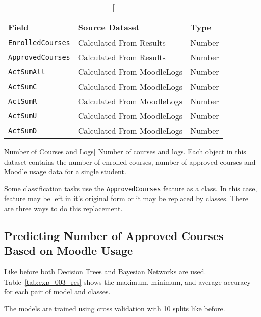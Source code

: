 \begin{table}[h!]
    \centering

    \begin{tabular}{| l | l | l |}
        \hline
        \textbf{Field}           & \textbf{Source Dataset}    & \textbf{Type} \\ \hline
        \texttt{EnrolledCourses} & Calculated From Results    & Number        \\ \hline
        \texttt{ApprovedCourses} & Calculated From Results    & Number        \\ \hline
        \texttt{ActSumAll}       & Calculated From MoodleLogs & Number        \\ \hline
        \texttt{ActSumC}         & Calculated From MoodleLogs & Number        \\ \hline
        \texttt{ActSumR}         & Calculated From MoodleLogs & Number        \\ \hline
        \texttt{ActSumU}         & Calculated From MoodleLogs & Number        \\ \hline
        \texttt{ActSumD}         & Calculated From MoodleLogs & Number        \\ \hline
    \end{tabular}

    \caption
        [Number of Courses and Logs]
        {Number of courses and logs. Each object in this dataset contains the
        number of enrolled courses, number of approved courses and Moodle usage
        data for a single student.}

    \label{tab:dat_002}
\end{table}

Some classification tasks use the \texttt{ApprovedCourses} feature as a class. In this case, feature may be left in it's original form or it may be replaced by classes. There are three ways to do this replacement.~

\subsection{Predicting Number of Approved Courses Based on Moodle Usage}

Like before both Decision Trees and Bayesian Networks are used.
Table~\ref{tab:exp_003_res} shows the maximum, minimum, and average accuracy
for each pair of model and classes.

The models are trained using cross validation with 10 splits like before.

